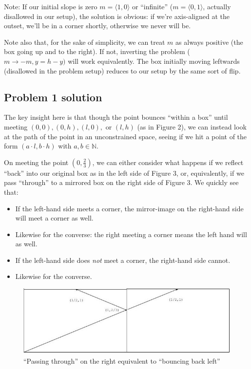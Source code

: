 \documentclass[11pt, oneside]{article} 	%
\begin{document}
Note: If our initial slope is zero $m = \langle 1, 0 \rangle$ or ``infinite'' ($m = \langle 0, 1 \rangle$, actually disallowed in our setup), the solution is obvious: if we're axis-aligned at the outset, we'll be in a corner shortly, otherwise we never will be.

Note also that, for the sake of simplicity, we can treat $m$ as always positive (the box going up and to the right).  If not, inverting the problem ($m \rightarrow -m, y = h - y)$ will work equivalently.  The box initially moving leftwards (disallowed in the problem setup) reduces to our setup by the same sort of flip.

\subsection{Problem 1 solution}

The key insight here is that though the point bounces ``within a box'' until meeting $(0,0), (0, h), (l, 0), $ or $(l, h)$ (as in Figure 2), we can instead look at the path of the point in an unconstrained space, seeing if we hit a point of the form $(a \cdot l, b \cdot h)$ with $a,b \in \mathbb{N}$.

On meeting the point $(0, \frac{2}{3})$, we can either consider what happens if we reflect ``back'' into our original box as in the left side of Figure 3, or, equivalently, if we pass ``through'' to a mirrored box on the right side of Figure 3.  We quickly see that:

\begin{itemize} 
\item If the left-hand side meets a corner, the mirror-image on the right-hand side will meet a corner as well.
\item Likewise for the converse: the right meeting a corner means the left hand will as well.
\item If the left-hand side does \emph{not} meet a corner, the right-hand side cannot.
\item Likewise for the converse.
\end{itemize}

\begin{figure}[!htb]
\centering
\includegraphics[scale=.5]{mirrorright}
 \caption{``Passing through'' on the right equivalent to ``bouncing back left''}
\end{figure}
\end{document}
